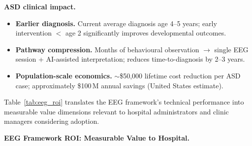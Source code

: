 \noindent\textbf{ASD clinical impact.}
\begin{itemize}[leftmargin=*, itemsep=2pt]
    \item \textbf{Earlier diagnosis.} Current average diagnosis age 4--5 years; early intervention $<$ age 2 significantly improves developmental outcomes.
    \item \textbf{Pathway compression.} Months of behavioural observation $\to$ single EEG session + AI-assisted interpretation; reduces time-to-diagnosis by 2--3 years.
    \item \textbf{Population-scale economics.} $\sim$\$50,000 lifetime cost reduction per ASD case; approximately \$100\,M annual savings (United States estimate).
\end{itemize}

\noindent Table~\ref{tab:eeg_roi} translates the EEG framework's technical performance into measurable value dimensions relevant to hospital administrators and clinic managers considering adoption.



\noindent\textbf{EEG Framework ROI: Measurable Value to Hospital.}

